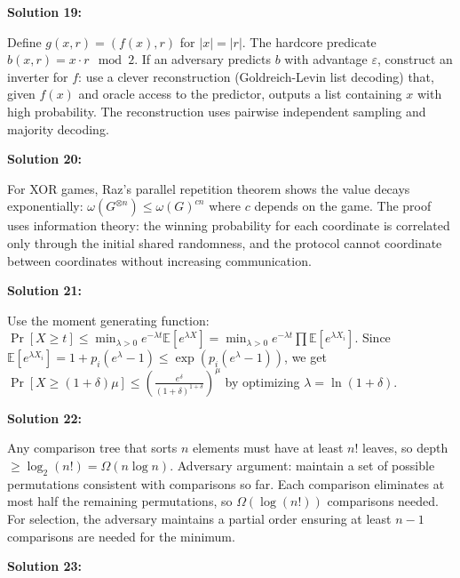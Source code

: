 \documentclass[12pt,a4paper]{exam}
\begin{document}
\vspace{0.5cm}

\textbf{Solution 19:}

Define $g(x,r) = (f(x), r)$ for $|x| = |r|$. The hardcore predicate $b(x,r) = x \cdot r \mod 2$. If an adversary predicts $b$ with advantage $\varepsilon$, construct an inverter for $f$: use a clever reconstruction (Goldreich-Levin list decoding) that, given $f(x)$ and oracle access to the predictor, outputs a list containing $x$ with high probability. The reconstruction uses pairwise independent sampling and majority decoding.

\vspace{0.5cm}

\textbf{Solution 20:}

For XOR games, Raz's parallel repetition theorem shows the value decays exponentially: $\omega(G^{\otimes n}) \leq \omega(G)^{c n}$ where $c$ depends on the game. The proof uses information theory: the winning probability for each coordinate is correlated only through the initial shared randomness, and the protocol cannot coordinate between coordinates without increasing communication.

\vspace{0.5cm}

\textbf{Solution 21:}

Use the moment generating function: $\Pr[X \geq t] \leq \min_{\lambda > 0} e^{-\lambda t} \mathbb{E}[e^{\lambda X}] = \min_{\lambda > 0} e^{-\lambda t} \prod \mathbb{E}[e^{\lambda X_i}]$. Since $\mathbb{E}[e^{\lambda X_i}] = 1 + p_i(e^\lambda - 1) \leq \exp(p_i(e^\lambda - 1))$, we get $\Pr[X \geq (1+\delta)\mu] \leq (\frac{e^\delta}{(1+\delta)^{1+\delta}})^\mu$ by optimizing $\lambda = \ln(1+\delta)$.

\vspace{0.5cm}

\textbf{Solution 22:}

Any comparison tree that sorts $n$ elements must have at least $n!$ leaves, so depth $\geq \log_2(n!) = \Omega(n \log n)$. Adversary argument: maintain a set of possible permutations consistent with comparisons so far. Each comparison eliminates at most half the remaining permutations, so $\Omega(\log(n!))$ comparisons needed. For selection, the adversary maintains a partial order ensuring at least $n-1$ comparisons are needed for the minimum.

\vspace{0.5cm}

\textbf{Solution 23:}
\end{document}

